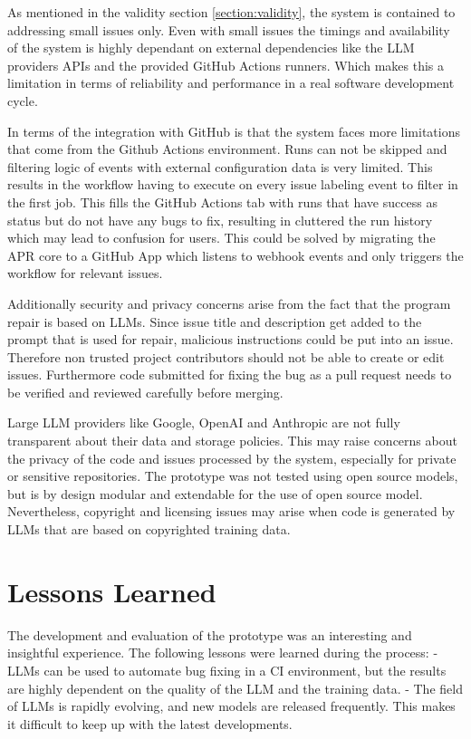 As mentioned in the validity section \ref{section:validity}, the system is contained to addressing small issues only. Even with small issues the timings and availability of the system is highly dependant on external dependencies like the LLM providers APIs and the provided GitHub Actions runners. Which makes this a limitation in terms of reliability and performance in a real software development cycle.

In terms of the integration with GitHub is that the system faces more limitations that come from the Github Actions environment. Runs can not be skipped and filtering logic of events with external configuration data is very limited. This results in the workflow having to execute on every issue labeling event to filter in the first job. This fills the GitHub Actions tab with runs that have success as status but do not have any bugs to fix, resulting in cluttered the run history which may lead to confusion for users. This could be solved by migrating the APR core to a GitHub App which listens to webhook events and only triggers the workflow for relevant issues.

Additionally security and privacy concerns arise from the fact that the program repair is based on LLMs. Since issue title and description get added to the prompt that is used for repair, malicious instructions could be put into an issue. Therefore non trusted project contributors should not be able to create or edit issues. Furthermore code submitted for fixing the bug as a pull request needs to be verified and reviewed carefully before merging.

Large LLM providers like Google, OpenAI and Anthropic are not fully transparent about their data and storage policies. This may raise concerns about the privacy of the code and issues processed by the system, especially for private or sensitive repositories. The prototype was not tested using open source models, but is by design modular and  extendable for the use of open source model. Nevertheless, copyright and licensing issues may arise when code is generated by LLMs that are based on copyrighted training data. \cite{sauvolaFutureSoftwareDevelopment2024, houLargeLanguageModels2024}


\section{Lessons Learned}
The development and evaluation of the prototype was an interesting and insightful experience. The following lessons were learned during the process:
- LLMs can be used to automate bug fixing in a CI environment, but the results are highly dependent on the quality of the LLM and the training data.
- The field of LLMs is rapidly evolving, and new models are released frequently. This makes it difficult to keep up with the latest developments.



